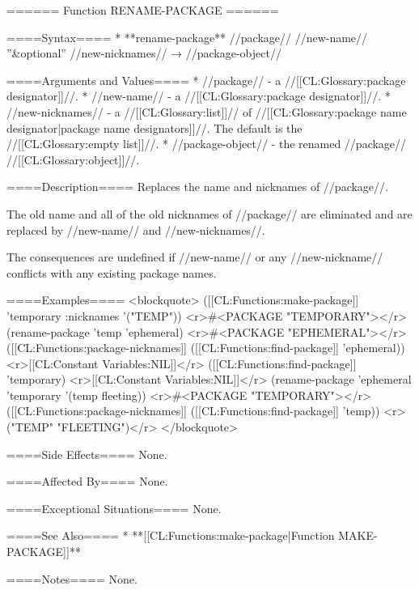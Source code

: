 ====== Function RENAME-PACKAGE ======

====Syntax====
  * **rename-package** //package// //new-name// ''&optional'' //new-nicknames// → //package-object//

====Arguments and Values====
  * //package// - a //[[CL:Glossary:package designator]]//.
  * //new-name// - a //[[CL:Glossary:package designator]]//.
  * //new-nicknames// - a //[[CL:Glossary:list]]// of //[[CL:Glossary:package name designator|package name designators]]//. The default is the //[[CL:Glossary:empty list]]//.
  * //package-object// - the renamed //package// //[[CL:Glossary:object]]//.

====Description====
Replaces the name and nicknames of //package//.

The old name and all of the old nicknames of //package// are eliminated and are replaced by //new-name// and //new-nicknames//.

The consequences are undefined if //new-name// or any //new-nickname// conflicts with any existing package names.

====Examples====
<blockquote>
([[CL:Functions:make-package]] 'temporary :nicknames '("TEMP")) <r>#<PACKAGE "TEMPORARY"></r>
(rename-package 'temp 'ephemeral) <r>#<PACKAGE "EPHEMERAL"></r>
([[CL:Functions:package-nicknames]] ([[CL:Functions:find-package]] 'ephemeral)) <r>[[CL:Constant Variables:NIL]]</r>
([[CL:Functions:find-package]] 'temporary) <r>[[CL:Constant Variables:NIL]]</r>
(rename-package 'ephemeral 'temporary '(temp fleeting)) <r>#<PACKAGE "TEMPORARY"></r>
([[CL:Functions:package-nicknames]] ([[CL:Functions:find-package]] 'temp)) <r>("TEMP" "FLEETING")</r>
</blockquote>

====Side Effects====
None.

====Affected By====
None.

====Exceptional Situations====
None.

====See Also====
  * **[[CL:Functions:make-package|Function MAKE-PACKAGE]]**

====Notes====
None.

 
